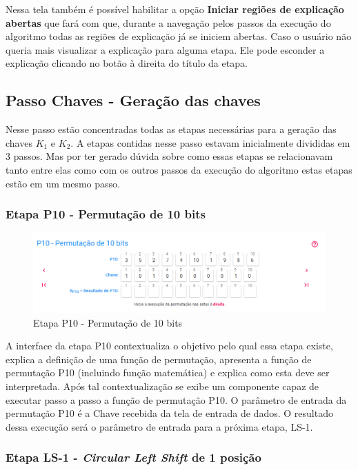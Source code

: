 Nessa tela também é possível habilitar a opção \textbf{Iniciar regiões de explicação abertas} que fará com que, durante a navegação pelos passos da execução do algoritmo todas as regiões de explicação já se iniciem abertas. Caso o usuário não queria mais visualizar a explicação para alguma etapa. Ele pode esconder a explicação clicando no botão à direita do título da etapa.

\subsection{Passo Chaves - Geração das chaves}

Nesse passo estão concentradas todas as etapas necessárias para a geração das chaves \(K_1\) e \(K_2\). A etapas contidas nesse passo estavam inicialmente divididas em 3 passos. Mas por ter gerado dúvida sobre como essas etapas se relacionavam tanto entre elas como com os outros passos da execução do algoritmo estas etapas estão em um mesmo passo.

\subsubsection{Etapa P10 - Permutação de 10 bits}

\begin{figure}[H]
    \centering
    \caption{Etapa P10 - Permutação de 10 bits}
    \includegraphics[width=1\linewidth]{UI/UIP10.png}
\end{figure}

A interface da etapa P10 contextualiza o objetivo pelo qual essa etapa existe, explica a definição de uma função de permutação, apresenta a função de permutação P10 (incluindo função matemática) e explica como esta deve ser interpretada. Após tal contextualização se exibe um componente capaz de executar passo a passo a função de permutação P10. O parâmetro de entrada da permutação P10 é a Chave recebida da tela de entrada de dados. O resultado dessa execução será o parâmetro de entrada para a próxima etapa, LS-1.

\subsubsection{Etapa LS-1 - \textit{Circular Left Shift} de 1 posição}

